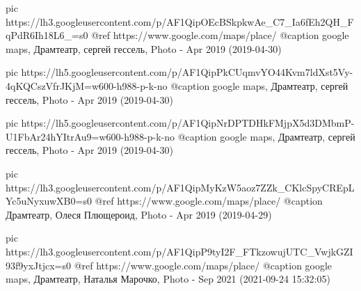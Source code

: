     pic https://lh3.googleusercontent.com/p/AF1QipOEcBSkpkwAe_C7_Ia6fEh2QH_FqPdR6Ih18L6_=s0
     @ref https://www.google.com/maps/place/%
     @caption google maps, Драмтеатр, сергей гессель, Photo - Apr 2019 (2019-04-30)


     pic https://lh5.googleusercontent.com/p/AF1QipPkCUqmvYO44Kvm7ldXst5Vy-4qKQCszVfrJKjM=w600-h988-p-k-no
     @caption google maps, Драмтеатр, сергей гессель, Photo - Apr 2019 (2019-04-30)

     pic https://lh5.googleusercontent.com/p/AF1QipNrDPTDHkFMjpX5d3DMbmP-U1FbAr24hYItrAu9=w600-h988-p-k-no
     @caption google maps, Драмтеатр, сергей гессель, Photo - Apr 2019 (2019-04-30)

     pic https://lh3.googleusercontent.com/p/AF1QipMyKzW5aoz7ZZk_CKlcSpyCREpLYc5uNyxuwXB0=s0
     @ref https://www.google.com/maps/place/%
     @caption Драмтеатр, Олеся Плющероид, Photo - Apr 2019 (2019-04-29)

     pic https://lh3.googleusercontent.com/p/AF1QipP9tyI2F_FTkzowujUTC_VwjkGZI93f9yxJtjcx=s0
     @ref https://www.google.com/maps/place/%
     @caption google maps, Драмтеатр, Наталья Марочко, Photo - Sep 2021 (2021-09-24 15:32:05)

